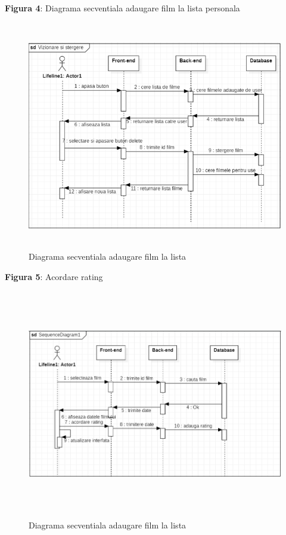 \par \textbf{Figura 4}: Diagrama secventiala adaugare film la lista personala
		\begin{figure}[!h]
			\centerline{\includegraphics[width=14cm, height=10cm]{figures/fig.png}}
			\caption{Diagrama secventiala adaugare film la lista}
			\label{fig}
		\end{figure}

\par \textbf{Figura 5}: Acordare rating
		\begin{figure}[!h]
			\centerline{\includegraphics[width=14cm, height=10cm]{figures/acordare rating.png}}
			\caption{Diagrama secventiala adaugare film la lista}
			\label{fig}
		\end{figure}

